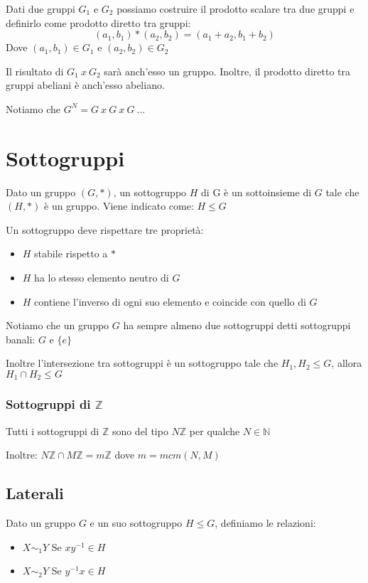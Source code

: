 \documentclass[a4paper, 10pt]{article}
\begin{document}
Dati due gruppi $G_1$ e $G_2$ possiamo costruire il prodotto scalare tra due gruppi e definirlo come prodotto diretto tra gruppi:
$$(a_1, b_1) * (a_2, b_2) = (a_1 + a_2, b_1 + b_2)$$
Dove $(a_1, b_1) \in G_1$ e $(a_2, b_2) \in G_2$ 

Il risultato di $G_1\ x\ G_2$ sarà anch'esso un gruppo. Inoltre, il prodotto diretto tra gruppi abeliani è anch'esso abeliano.

Notiamo che $G^N = G\ x\ G\ x\ G\ ...$

\section{Sottogruppi}

Dato un gruppo $(G, *)$, un sottogruppo $H$ di G è un sottoinsieme di $G$ tale che $(H, *)$ è un gruppo. Viene indicato come: $H \leq G$

Un sottogruppo deve rispettare tre proprietà:

\begin{itemize}
	\item $H$ stabile rispetto a $*$
	\item $H$ ha lo stesso elemento neutro di $G$
	\item $H$ contiene l'inverso di ogni suo elemento e coincide con quello di $G$
\end{itemize}

Notiamo che un gruppo $G$ ha sempre almeno due sottogruppi detti sottogruppi banali: $G$ e $\{e\}$

Inoltre l'intersezione tra sottogruppi è un sottogruppo tale che $H_1, H_2 \leq G$, allora $H_1 \cap H_2 \leq G$
\subsubsection{Sottogruppi di $\mathbb{Z}$}

Tutti i sottogruppi di $\mathbb{Z}$ sono del tipo $N\mathbb{Z}$ per qualche $N \in \mathbb{N}$

Inoltre: $N\mathbb{Z} \cap M\mathbb{Z} = m\mathbb{Z}$ dove $m = mcm(N,M)$

\subsection{Laterali}

Dato un gruppo $G$ e un suo sottogruppo $H \leq G$, definiamo le relazioni: 

\begin{itemize}
	\item $X \sim_1 Y $ Se $xy^{-1} \in H$
	\item $X \sim_2 Y $ Se $y^{-1}x \in H$
\end{itemize}
\end{document}
